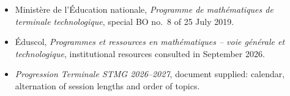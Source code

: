 \begin{itemize}
\item Ministère de l'Éducation nationale, \emph{Programme de mathématiques de terminale technologique}, special BO no.~8 of 25 July 2019.
\item Éduscol, \emph{Programmes et ressources en mathématiques -- voie générale et technologique}, institutional resources consulted in September 2026.
\item \emph{Progression Terminale STMG 2026--2027}, document supplied: calendar, alternation of session lengths and order of topics.
\end{itemize}
